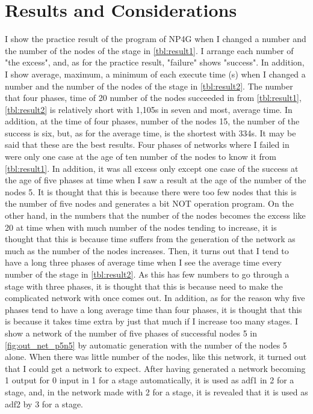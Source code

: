 \documentclass{article}
\begin{document}
\section {Results and Considerations}
I show the practice result of the program of NP4G when I changed a number and the number of the nodes of the stage in \ref{tbl:result1}.
I arrange each number of "the excess", and, as for the practice result, "failure" shows "success".
In addition, I show average, maximum, a minimum of each execute time (s) when I changed a number and the number of the nodes of the stage in \ref{tbl:result2}.
The number that four phases, time of 20 number of the nodes succeeded in from \ref{tbl:result1}, \ref{tbl:result2} is relatively short with 1,105s in seven and most, average time.
In addition, at the time of four phases, number of the nodes 15, the number of the success is six, but, as for the average time, is the shortest with 334s.
It may be said that these are the best results.
Four phases of networks where I failed in were only one case at the age of ten number of the nodes to know it from \ref{tbl:result1}.
In addition, it was all excess only except one case of the success at the age of five phases at time when I saw a result at the age of the number of the nodes 5.
It is thought that this is because there were too few nodes that this is the number of five nodes and generates a bit NOT operation program.
On the other hand, in the numbers that the number of the nodes becomes the excess like 20 at time when with much number of the nodes tending to increase, it is thought that this is because time suffers from the generation of the network as much as the number of the nodes increases.
Then, it turns out that I tend to have a long three phases of average time when I see the average time every number of the stage in \ref{tbl:result2}.
As this has few numbers to go through a stage with three phases, it is thought that this is because need to make the complicated network with once comes out.
In addition, as for the reason why five phases tend to have a long average time than four phases, it is thought that this is because it takes time extra by just that much if I increase too many stages.
I show a network of the number of five phases of successful nodes 5 in \ref{fig:out_net_p5n5} by automatic generation with the number of the nodes 5 alone.
When there was little number of the nodes, like this network, it turned out that I could get a network to expect.
After having generated a network becoming 1 output for 0 input in 1 for a stage automatically, it is used as adf1 in 2 for a stage, and, in the network made with 2 for a stage, it is revealed that it is used as adf2 by 3 for a stage.
\end{document}
